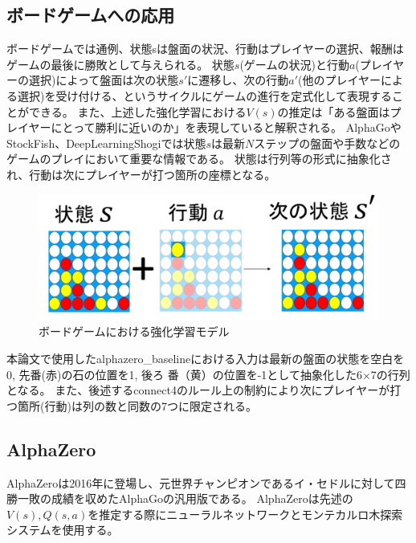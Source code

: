 \subsection{ボードゲームへの応用}
ボードゲームでは通例、状態sは盤面の状況、行動はプレイヤーの選択、報酬はゲームの最後に勝敗として与えられる。
状態$s$(ゲームの状況)と行動$a$(プレイヤーの選択)によって盤面は次の状態$s'$に遷移し、次の行動$a'$(他のプレイヤーによる選択)を受け付ける、というサイクルにゲームの進行を定式化して表現することができる。
また、上述した強化学習における$V(s)$の推定は「ある盤面はプレイヤーにとって勝利に近いのか」を表現していると解釈される。
AlphaGo\cite{AlphaGo}やStockFish\cite{StockFish}、DeepLearningShogi\cite{dlshogi}では状態$s$は最新$N$ステップの盤面や手数などのゲームのプレイにおいて重要な情報である。
状態は行列等の形式に抽象化され、行動は次にプレイヤーが打つ箇所の座標となる。
\begin{figure}[t]
	\centering
	\includegraphics[width=\linewidth]{./figure/transition.png}
	\caption{ボードゲームにおける強化学習モデル}
	\label{fig:transition}
\end{figure}

本論文で使用したalphazero\_baselineにおける入力は最新の盤面の状態を空白を0, 先番(赤)の石の位置を1, 後ろ
番（黄）の位置を-1として抽象化した6$\times$7の行列となる。
また、後述するconnect4のルール上の制約により次にプレイヤーが打つ箇所(行動)は列の数と同数の7つに限定される。

\subsection{AlphaZero\cite{AlphaZero}}
AlphaZeroは2016年に登場し、元世界チャンピオンであるイ・セドルに対して四勝一敗の成績を収めたAlphaGoの汎用版である。
AlphaZeroは先述の$V(s),Q(s, a)$を推定する際にニューラルネットワークとモンテカルロ木探索システムを使用する。
